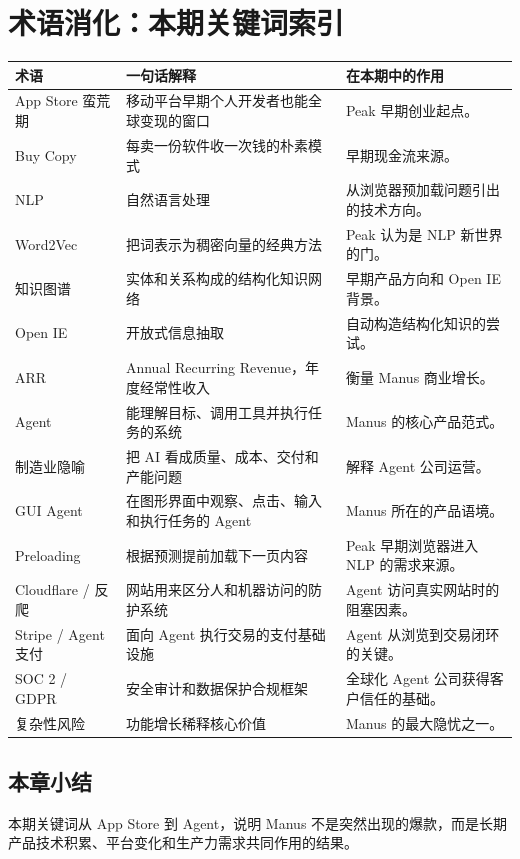 \section{术语消化：本期关键词索引}

\begin{longtable}{p{}p{}p{}}
\toprule
术语 & 一句话解释 & 在本期中的作用 \\
\midrule
App Store 蛮荒期 & 移动平台早期个人开发者也能全球变现的窗口 & Peak 早期创业起点。 \\
Buy Copy & 每卖一份软件收一次钱的朴素模式 & 早期现金流来源。 \\
NLP & 自然语言处理 & 从浏览器预加载问题引出的技术方向。 \\
Word2Vec & 把词表示为稠密向量的经典方法 & Peak 认为是 NLP 新世界的门。 \\
知识图谱 & 实体和关系构成的结构化知识网络 & 早期产品方向和 Open IE 背景。 \\
Open IE & 开放式信息抽取 & 自动构造结构化知识的尝试。 \\
ARR & Annual Recurring Revenue，年度经常性收入 & 衡量 Manus 商业增长。 \\
Agent & 能理解目标、调用工具并执行任务的系统 & Manus 的核心产品范式。 \\
制造业隐喻 & 把 AI 看成质量、成本、交付和产能问题 & 解释 Agent 公司运营。 \\
GUI Agent & 在图形界面中观察、点击、输入和执行任务的 Agent & Manus 所在的产品语境。 \\
Preloading & 根据预测提前加载下一页内容 & Peak 早期浏览器进入 NLP 的需求来源。 \\
Cloudflare / 反爬 & 网站用来区分人和机器访问的防护系统 & Agent 访问真实网站时的阻塞因素。 \\
Stripe / Agent 支付 & 面向 Agent 执行交易的支付基础设施 & Agent 从浏览到交易闭环的关键。 \\
SOC 2 / GDPR & 安全审计和数据保护合规框架 & 全球化 Agent 公司获得客户信任的基础。 \\
复杂性风险 & 功能增长稀释核心价值 & Manus 的最大隐忧之一。 \\
\bottomrule
\end{longtable}

\subsection{本章小结}

本期关键词从 App Store 到 Agent，说明 Manus 不是突然出现的爆款，而是长期产品技术积累、平台变化和生产力需求共同作用的结果。

